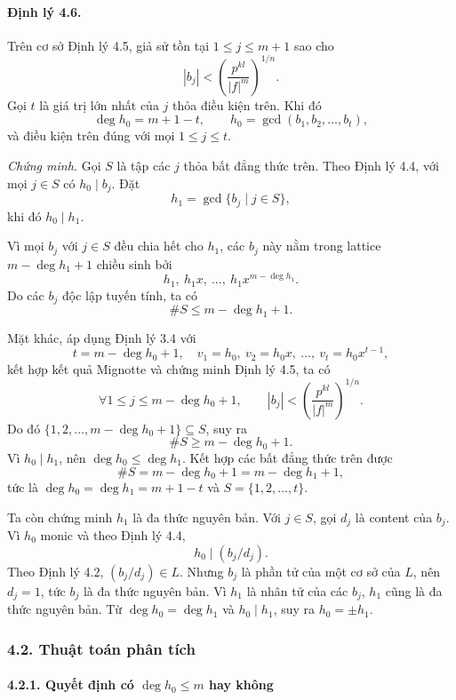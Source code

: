 \documentclass[11pt]{article}
\begin{document}
\paragraph{Định lý 4.6.}
Trên cơ sở Định lý 4.5, giả sử tồn tại \(1\le j\le m+1\) sao cho
\[
  |b_j|<\left(\frac{p^{kl}}{|f|^m}\right)^{1/n}.
\]
Gọi \(t\) là giá trị lớn nhất của \(j\) thỏa điều kiện trên. Khi đó
\[
  \deg h_0=m+1-t,\qquad
  h_0=\gcd(b_1,b_2,\ldots,b_t),
\]
và điều kiện trên đúng với mọi \(1\le j\le t\).

\emph{Chứng minh.}
Gọi \(S\) là tập các \(j\) thỏa bất đẳng thức trên. Theo Định lý 4.4, với mọi
\(j\in S\) có \(h_0\mid b_j\). Đặt
\[
  h_1=\gcd\{b_j\mid j\in S\},
\]
khi đó \(h_0\mid h_1\).

Vì mọi \(b_j\) với \(j\in S\) đều chia hết cho \(h_1\), các \(b_j\) này nằm
trong lattice \(m-\deg h_1+1\) chiều sinh bởi
\[
  h_1,\ h_1x,\ \ldots,\ h_1x^{m-\deg h_1}.
\]
Do các \(b_j\) độc lập tuyến tính, ta có
\[
  \#S\le m-\deg h_1+1.
\]

Mặt khác, áp dụng Định lý 3.4 với
\[
  t=m-\deg h_0+1,\quad
  v_1=h_0,\ v_2=h_0x,\ \ldots,\ v_t=h_0x^{t-1},
\]
kết hợp kết quả Mignotte và chứng minh Định lý 4.5, ta có
\[
  \forall 1\le j\le m-\deg h_0+1,\qquad
  |b_j|<\left(\frac{p^{kl}}{|f|^m}\right)^{1/n}.
\]
Do đó \(\{1,2,\ldots,m-\deg h_0+1\}\subseteq S\), suy ra
\[
  \#S\ge m-\deg h_0+1.
\]
Vì \(h_0\mid h_1\), nên \(\deg h_0\le \deg h_1\). Kết hợp các bất đẳng thức
trên được
\[
  \#S=m-\deg h_0+1=m-\deg h_1+1,
\]
tức là \(\deg h_0=\deg h_1=m+1-t\) và \(S=\{1,2,\ldots,t\}\).

Ta còn chứng minh \(h_1\) là đa thức nguyên bản. Với \(j\in S\), gọi \(d_j\)
là content của \(b_j\). Vì \(h_0\) monic và theo Định lý 4.4,
\[
  h_0\mid (b_j/d_j).
\]
Theo Định lý 4.2, \((b_j/d_j)\in L\). Nhưng \(b_j\) là phần tử của một cơ sở
của \(L\), nên \(d_j=1\), tức \(b_j\) là đa thức nguyên bản. Vì \(h_1\) là
nhân tử của các \(b_j\), \(h_1\) cũng là đa thức nguyên bản. Từ
\(\deg h_0=\deg h_1\) và \(h_0\mid h_1\), suy ra \(h_0=\pm h_1\).

\subsubsection*{4.2. Thuật toán phân tích}

\paragraph{4.2.1. Quyết định có \(\deg h_0\le m\) hay không}
\end{document}

